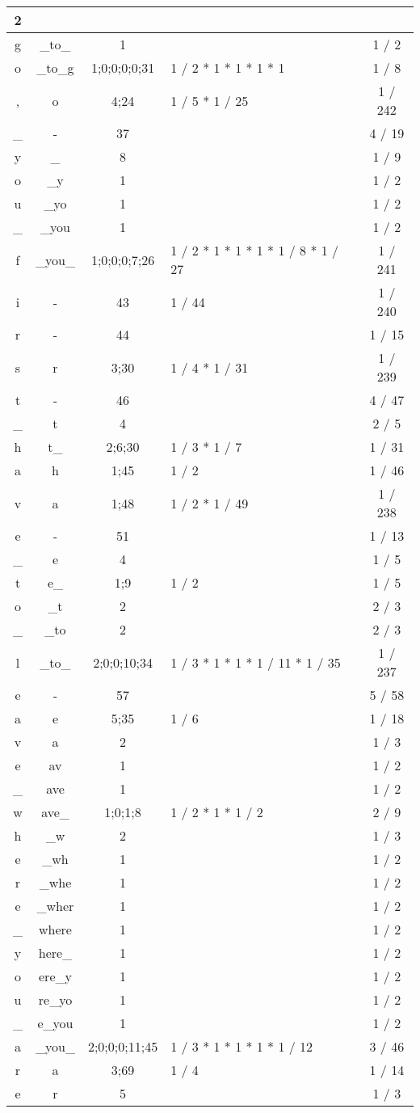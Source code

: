\begin{center}
\begin{longtable}{|c|c|c|p{3cm}|c|}
2\\  \hline g&\_to\_&1&&1 / 2\\  \hline o&\_to\_g&1;0;0;0;0;31&1 / 2 * 1 * 1 * 1 * 1&1 / 8\\  \hline ,&o&4;24&1 / 5 * 1 / 25&1 / 242\\  \hline \_&-&37&&4 / 19\\  \hline y&\_&8&&1 / 9\\  \hline o&\_y&1&&1 / 2\\  \hline u&\_yo&1&&1 / 2\\  \hline \_&\_you&1&&1 / 2\\  \hline f&\_you\_&1;0;0;0;7;26&1 / 2 * 1 * 1 * 1 * 1 / 8 * 1 / 27&1 / 241\\  \hline i&-&43&1 / 44&1 / 240\\  \hline r&-&44&&1 / 15\\  \hline s&r&3;30&1 / 4 * 1 / 31&1 / 239\\  \hline t&-&46&&4 / 47\\  \hline \_&t&4&&2 / 5\\  \hline h&t\_&2;6;30&1 / 3 * 1 / 7&1 / 31\\  \hline a&h&1;45&1 / 2&1 / 46\\  \hline v&a&1;48&1 / 2 * 1 / 49&1 / 238\\  \hline e&-&51&&1 / 13\\  \hline \_&e&4&&1 / 5\\  \hline t&e\_&1;9&1 / 2&1 / 5\\  \hline o&\_t&2&&2 / 3\\  \hline \_&\_to&2&&2 / 3\\  \hline l&\_to\_&2;0;0;10;34&1 / 3 * 1 * 1 * 1 / 11 * 1 / 35&1 / 237\\  \hline e&-&57&&5 / 58\\  \hline a&e&5;35&1 / 6&1 / 18\\  \hline v&a&2&&1 / 3\\  \hline e&av&1&&1 / 2\\  \hline \_&ave&1&&1 / 2\\  \hline w&ave\_&1;0;1;8&1 / 2 * 1 * 1 / 2&2 / 9\\  \hline h&\_w&2&&1 / 3\\  \hline e&\_wh&1&&1 / 2\\  \hline r&\_whe&1&&1 / 2\\  \hline e&\_wher&1&&1 / 2\\  \hline \_&where&1&&1 / 2\\  \hline y&here\_&1&&1 / 2\\  \hline o&ere\_y&1&&1 / 2\\  \hline u&re\_yo&1&&1 / 2\\  \hline \_&e\_you&1&&1 / 2\\  \hline a&\_you\_&2;0;0;0;11;45&1 / 3 * 1 * 1 * 1 * 1 / 12&3 / 46\\  \hline r&a&3;69&1 / 4&1 / 14\\  \hline e&r&5&&1 / 3\\  \hline 
    \end{longtable}
\end{center}

